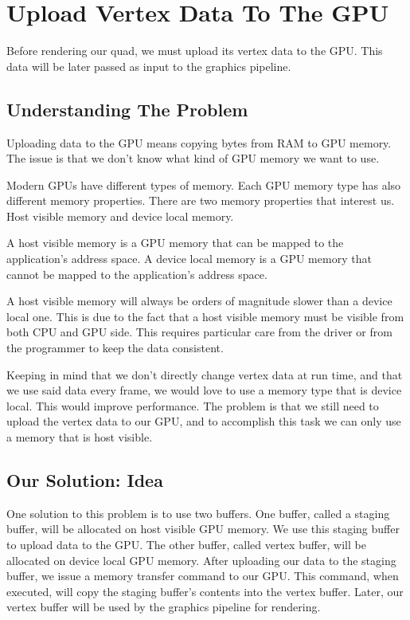 \section{Upload Vertex Data To The GPU}

Before rendering our quad, we must upload its vertex data to the GPU.
This data will be later passed as input to the graphics pipeline.

\subsection{Understanding The Problem}

Uploading data to the GPU means copying bytes from RAM to GPU memory.
The issue is that we don't know what kind of GPU memory we want to use.

Modern GPUs have different types of memory.
Each GPU memory type has also different memory properties.
There are two memory properties that interest us.
Host visible memory and device local memory.

A host visible memory is a GPU memory that can be mapped to the
application's address space.
A device local memory is a GPU memory that cannot be mapped to the
application's address space.

A host visible memory will always be orders of magnitude slower than a
device local one.
This is due to the fact that a host visible memory must be visible from both
CPU and GPU side.
This requires particular care from the driver or from the programmer
to keep the data consistent.

Keeping in mind that we don't directly change vertex data at run time,
and that we use said data every frame, we would love to use a memory type
that is device local.
This would improve performance.
The problem is that we still need to upload the vertex data to our GPU,
and to accomplish this task we can only use a memory that is host visible.

\subsection{Our Solution: Idea}

One solution to this problem is to use two buffers.
One buffer, called a staging buffer, will be allocated on host visible
GPU memory.
We use this staging buffer to upload data to the GPU.
The other buffer, called vertex buffer, will be allocated on device local
GPU memory.
After uploading our data to the staging buffer, we issue a memory transfer command
to our GPU.
This command, when executed, will copy the staging buffer's contents
into the vertex buffer.
Later, our vertex buffer will be used by the graphics pipeline for rendering.

